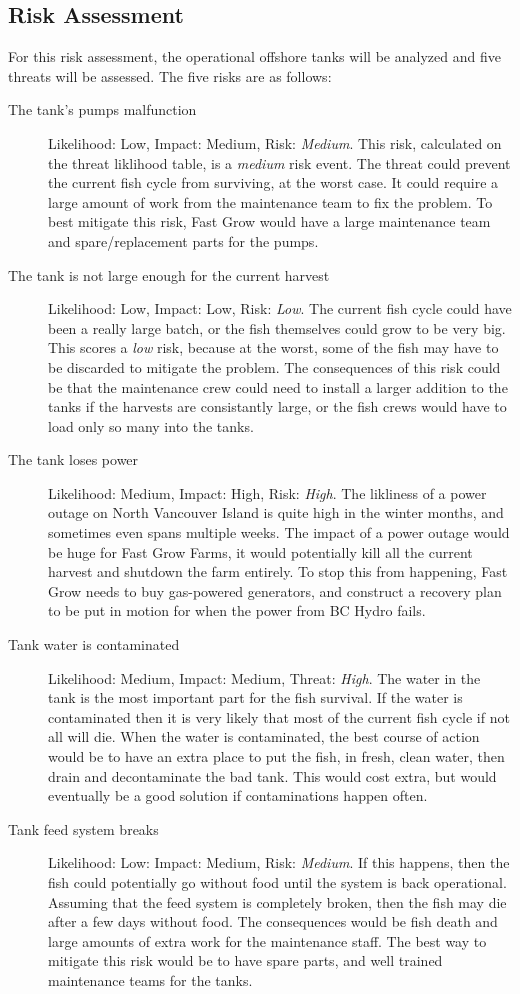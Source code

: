 \documentclass{article}
\numberwithin{equation}{section} %
\numberwithin{figure}{section} %
\numberwithin{table}{section} %
\begin{document}
\subsection{Risk Assessment}
For this risk assessment, the operational offshore tanks will be analyzed and five threats will be assessed.  The five risks are as follows: 
\begin{description}
	\item[The tank's pumps malfunction]  Likelihood: Low, Impact: Medium, Risk: \textit{Medium}.  This risk, calculated on the threat liklihood table, is a \textit{medium} risk event.  The threat could prevent the current fish cycle from surviving, at the worst case.  It could require a large amount of work from the maintenance team to fix the problem.  To best mitigate this risk, Fast Grow would have a large maintenance team and spare/replacement parts for the pumps.
	\item[The tank is not large enough for the current harvest]  Likelihood: Low, Impact: Low, Risk: \textit{Low}.  The current fish cycle could have been a really large batch, or the fish themselves could grow to be very big.  This scores a \textit{low} risk, because at the worst, some of the fish may have to be discarded to mitigate the problem.  The consequences of this risk could be that the maintenance crew could need to install a larger addition to the tanks if the harvests are consistantly large, or the fish crews would have to load only so many into the tanks.
	\item[The tank loses power]  Likelihood: Medium, Impact: High, Risk: \textit{High}.  The likliness of a power outage on North Vancouver Island is quite high in the winter months, and sometimes even spans multiple weeks. The impact of a power outage would be huge for Fast Grow Farms, it would potentially kill all the current harvest and shutdown the farm entirely.  To stop this from happening, Fast Grow needs to buy gas-powered generators, and construct a recovery plan to be put in motion for when the power from BC Hydro fails. 
	\item[Tank water is contaminated]  Likelihood: Medium, Impact: Medium, Threat: \textit{High}.  The water in the tank is the most important part for the fish survival.  If the water is contaminated then it is very likely that most of the current fish cycle if not all will die.  When the water is contaminated, the best course of action would be to have an extra place to put the fish, in fresh, clean water, then drain and decontaminate the bad tank.  This would cost extra, but would eventually be a good solution if contaminations happen often.  
	\item[Tank feed system breaks]  Likelihood: Low: Impact: Medium, Risk: \textit{Medium}.  If this happens, then the fish could potentially go without food until the system is back operational. Assuming that the feed system is completely broken, then the fish may die after a few days without food.  The consequences would be fish death and large amounts of extra work for the maintenance staff.  The best way to mitigate this risk would be to have spare parts, and well trained maintenance teams for the tanks. 
\end{description}
\end{document}
